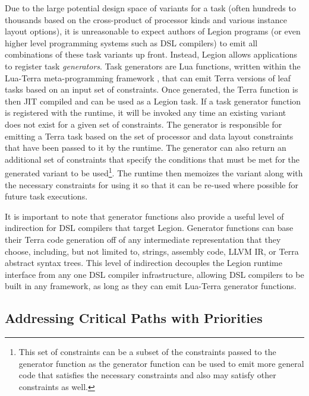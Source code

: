 Due to the large potential design space of variants for a
task (often hundreds to thousands based on the cross-product
of processor kinds and various instance layout options), it is 
unreasonable to expect authors of Legion programs (or even 
higher level programming systems such as DSL compilers) to emit 
all combinations of these task variants up front. Instead,
Legion allows applications to register task {\em generators}.
Task generators are Lua functions, written within the 
Lua-Terra meta-programming framework \cite{Terra13},
that can emit Terra versions of leaf tasks based on an
input set of constraints. Once generated, the Terra function
is then JIT compiled and can be used as a Legion task.
If a task generator function is registered with the 
runtime, it will be invoked any time an existing variant 
does not exist for a given set of constraints. The 
generator is responsible for emitting a Terra task based
on the set of processor and data layout constraints
that have been passed to it by the runtime.  The generator
can also return an additional set of constraints
that specify the conditions that must be met
for the generated variant to be used\footnote{This set
of constraints can be a subset of the constraints passed
to the generator function as the generator function can 
be used to emit more general code that satisfies
the necessary constraints and also may satisfy other
constraints as well.}. The runtime then memoizes the 
variant along with the necessary constraints for using 
it so that it can be re-used where possible
for future task executions.

It is important to note that generator functions also
provide a useful level of indirection for DSL compilers
that target Legion.  Generator functions can base
their Terra code generation off of any intermediate
representation that they choose, including, but
not limited to, strings, assembly code, LLVM IR, or
Terra abstract syntax trees. This level of indirection
decouples the Legion runtime interface from any one
DSL compiler infrastructure, allowing DSL compilers
to be built in any framework, as long as they can 
emit Lua-Terra generator functions.

\subsection{Addressing Critical Paths with Priorities}
\label{subsec:priorities}

